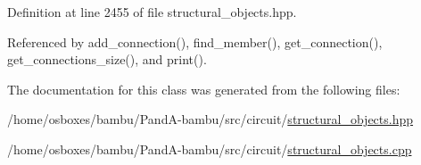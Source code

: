 Definition at line 2455 of file structural\+\_\+objects.\+hpp.



Referenced by add\+\_\+connection(), find\+\_\+member(), get\+\_\+connection(), get\+\_\+connections\+\_\+size(), and print().



The documentation for this class was generated from the following files\+:\begin{DoxyCompactItemize}
\item 
/home/osboxes/bambu/\+Pand\+A-\/bambu/src/circuit/\hyperlink{structural__objects_8hpp}{structural\+\_\+objects.\+hpp}\item 
/home/osboxes/bambu/\+Pand\+A-\/bambu/src/circuit/\hyperlink{structural__objects_8cpp}{structural\+\_\+objects.\+cpp}\end{DoxyCompactItemize}
